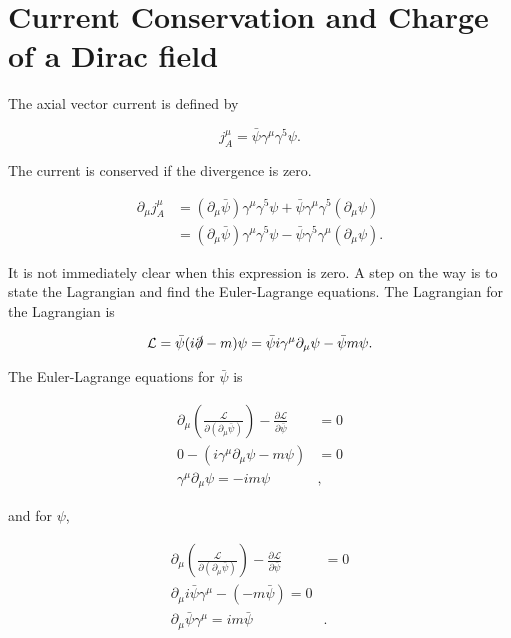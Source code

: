\documentclass[11pt, a4paper]{amsart}
\begin{document}
\section{Current Conservation and Charge of a Dirac field}
The axial vector current is defined by

\begin{equation}
j_A^\mu = \bar{\psi} \gamma^\mu \gamma^5 \psi.
\end{equation}

The current is conserved if the divergence is zero.

\begin{align}
\partial_\mu j_A^\mu 
&= (\partial_\mu \bar{\psi} ) \gamma^\mu \gamma^5 \psi + \bar{\psi} \gamma^\mu \gamma^5 (\partial_\mu \psi) \\
&= (\partial_\mu \bar{\psi} ) \gamma^\mu \gamma^5 \psi  - \bar{\psi} \gamma^5 \gamma^\mu (\partial_\mu \psi) \label{eq:current1}.
\end{align}

It is not immediately clear when this expression is zero. A step on the way is to state the Lagrangian and find the Euler-Lagrange equations. The Lagrangian for the Lagrangian is

\begin{equation}
\mathcal{L} = \bar{\psi}(i \slashed{\partial} - m) \psi =  \bar{\psi}i\gamma^\mu \partial_\mu \psi - \bar{\psi}m\psi.
\end{equation}

The Euler-Lagrange equations for $\bar{\psi}$ is

\begin{align}
\partial_\mu \left(\frac{\mathcal{L}}{\partial (\partial_\mu \bar{\psi})} \right) - \frac{\partial \mathcal{L}}{\partial \bar{\psi}} &= 0 \\
0 - (i\gamma^\mu\partial_\mu\psi - m \psi) &= 0	\\
\gamma^\mu\partial_\mu \psi = -im\psi& \label{eq:psibarEQM},
\end{align}

and for $\psi$,

\begin{align}
\partial_\mu \left(\frac{\mathcal{L}}{\partial (\partial_\mu \bar{\psi})} \right) - \frac{\partial \mathcal{L}}{\partial \bar{\psi}} &= 0 \\
\partial_\mu i\bar{\psi} \gamma^\mu - (-m\bar{\psi}) = 0 \\
\partial_\mu \bar{\psi} \gamma^\mu = im\bar{\psi}& \label{eq:psiEQM}.
\end{align}
\end{document}
